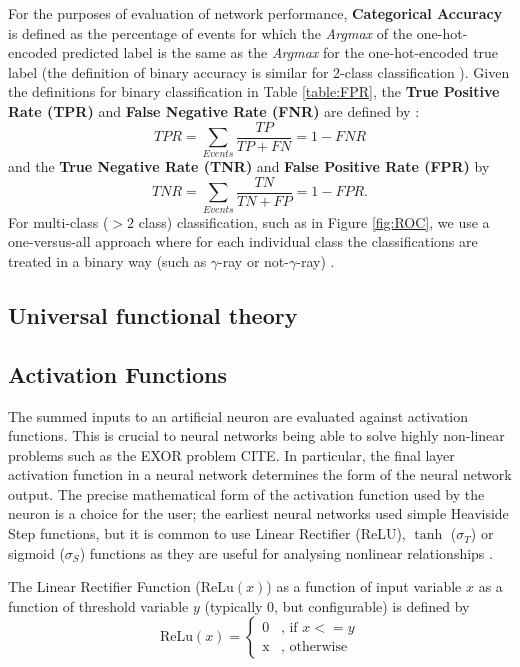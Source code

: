 For the purposes of evaluation of network performance, \textbf{Categorical Accuracy} \cite{Keras} is defined as the percentage of events for which the \textit{Argmax} of the one-hot-encoded predicted label is the same as the \textit{Argmax} for the one-hot-encoded true label (the definition of binary accuracy is similar for 2-class classification \cite{Keras}). Given the definitions for binary classification in Table \ref{table:FPR}, the \textbf{True Positive Rate (TPR)} and \textbf{False Negative Rate (FNR)} are defined by \cite{fawcett}:
\begin{equation}
    TPR=\sum_{Events}\frac{TP}{TP+FN}=1-FNR
\end{equation}
and the \textbf{True Negative Rate (TNR)} and \textbf{False Positive Rate (FPR)} by
\begin{equation}
    TNR=\sum_{Events}\frac{TN}{TN+FP}=1-FPR.
\end{equation} For multi-class ($>2$ class) classification, such as in Figure \ref{fig:ROC}, we use a one-versus-all approach where for each individual class the classifications are treated in a binary way (such as $\gamma$-ray or not-$\gamma$-ray) \cite{fawcett}\cite{scikit}. 

\subsection{Universal functional theory}

\subsection{Activation Functions}

The summed inputs to an artificial neuron are evaluated against activation functions. This is crucial to neural networks being able to solve highly non-linear problems such as the EXOR problem CITE. In particular, the final layer activation function in a neural network determines the form of the neural network output. The precise mathematical form of the activation function used by the neuron is a choice for the user; the earliest neural networks used simple Heaviside Step functions, but 
it is common to use Linear Rectifier (ReLU), $\tanh$ ($\sigma_T$) or sigmoid ($\sigma_S$) functions as they are useful for analysing nonlinear relationships \cite{C++CNN}\cite{Keras}. 

The Linear Rectifier Function ($\textrm{ReLu}(x)$) as a function of input variable $x$ as a function of threshold variable $y$ (typically 0, but configurable) is defined by
\begin{equation}
    \textrm{ReLu}(x)=\begin{cases}\mbox{0} & \mbox{, if } x <= y \\ \mbox{x} & \mbox{, otherwise} \end{cases}
\end{equation}

